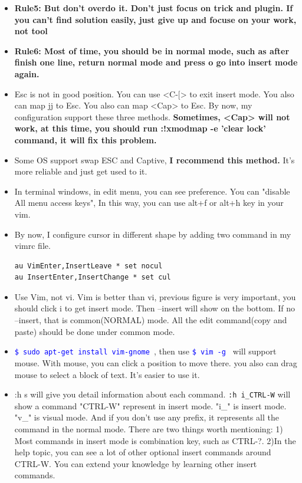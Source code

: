 \documentclass[a4paper,12pt,twoside]{book}
\newcommand{\linuxcommand}[1]{\texttt{\textcolor{blue}{\$ #1 \Pisymbol{psy}{191}}}}
\begin{document}
\begin{itemize}
		\item \textbf{Rule5: But don't overdo it. Don't just focus on trick and plugin. If you can't find solution easily, just give up and focuse on your work, not tool}

		\item  \textbf{Rule6: Most of time, you should be in normal mode,  such as after finish one line, return normal mode and press o go into insert mode again.} 

		\item Esc is not in good position. You can use <C-$[$> to exit insert mode. You also can map jj to Esc. You also can map <Cap> to Esc. By now, my configuration support these three methods. \textbf{Sometimes, <Cap> will not work, at this time, you should run :!xmodmap -e 'clear lock' command, it will fix this problem.}

		\item Some OS support swap ESC and Captive, \textbf{I recommend this method.} It's more reliable and just get used to it.  

		\item In terminal windows, in edit menu, you can see preference. You can "disable All menu access keys", In this way, you can use alt+f or alt+h key in your vim. 

		\item By now, I configure cursor in different shape by adding two command in my vimrc file.
\begin{verbatim}
au VimEnter,InsertLeave * set nocul
au InsertEnter,InsertChange * set cul
\end{verbatim} 

		\item Use Vim, not vi. Vim is better than vi, previous figure is very important, you should click i to get insert mode. Then --insert will show on the bottom. If no --insert, that is common(NORMAL) mode. All the edit command(copy and paste) should be done under common mode. 

		\item \linuxcommand{sudo apt-get install vim-gnome}, then use \linuxcommand{vim -g} will support mouse.  With mouse, you can click a position to move there. you also can drag mouse to select a block of text. It's easier to use it.  
		\item :h s will give you detail information about each command. \verb=:h i_CTRL-W= will show a command "CTRL-W" represent in insert mode. "i\_" is insert mode. "v\_" is visual mode. And if you don't use any prefix, it represents all the command in the normal mode. There are two things worth mentioning: 1) Most commands in insert mode is combination key, such as CTRL-?. 2)In the help topic, you can see a lot of other optional insert commands around CTRL-W. You can extend your knowledge by learning other insert commands.


\end{itemize}
\end{document}
